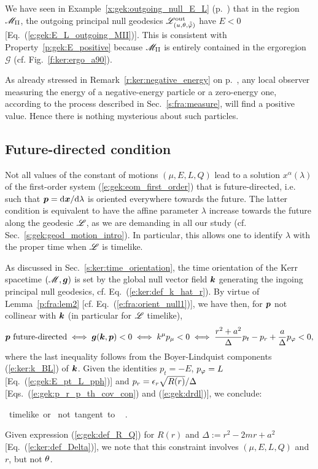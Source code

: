 \begin{example}
We have seen in Example~\ref{x:gek:outgoing_null_E_L} (p.~\pageref{x:gek:outgoing_null_E_L})
that in the region $\mathscr{M}_{\rm II}$, the outgoing principal null geodesics $\mathscr{L}^{\rm out}_{(u,\theta,\tilde{{\tilde\varphi}})}$ have $E<0$ [Eq.~(\ref{e:gek:E_L_outgoing_MII})]. This is consistent with
Property~\ref{p:gek:E_positive} because $\mathscr{M}_{\rm II}$ is entirely contained in the ergoregion $\mathscr{G}$
(cf. Fig.~\ref{f:ker:ergo_a90}).
\end{example}

\begin{remark}
As already stressed in Remark~\ref{r:ker:negative_energy} on p.~\pageref{r:ker:negative_energy}, any local
observer measuring the energy of a negative-energy particle or a zero-energy one, according to the process described in Sec.~\ref{s:fra:measure}, will
find a positive value. Hence there is nothing mysterious about such particles.
\end{remark}

\subsection{Future-directed condition}

Not all values of the constant of motions $(\mu,E,L,Q)$ lead to a solution
$x^\alpha(\lambda)$ of the first-order system (\ref{e:gek:eom_first_order})
that is future-directed, i.e. such that $\bm{p} = \mathrm{d} \bm{x}/\mathrm{d}\lambda$
is oriented everywhere towards the future.
The latter condition is equivalent to have the affine parameter $\lambda$ increase
towards the future along the geodesic $\mathscr{L}$, as we are demanding in all
our study (cf. Sec.~\ref{s:gek:geod_motion_intro}).
In particular, this allows one to identify $\lambda$ with the proper
time when $\mathscr{L}$ is timelike.


As discussed in Sec.~\ref{s:ker:time_orientation}, the time orientation of
the Kerr spacetime $(\mathscr{M},\bm{g})$ is set by the global null
vector field $\bm{k}$ generating the ingoing principal null geodesics, cf. Eq.~(\ref{e:ker:def_k_hat_r}).
By virtue of Lemma~\ref{p:fra:lem2}
[cf. Eq.~(\ref{e:fra:orient_null1})], we have then, for $\bm{p}$ not collinear
with $\bm{k}$ (in particular for $\mathscr{L}$ timelike),
\[
    \bm{p} \ \mbox{future-directed} \iff \bm{g}(\bm{k},\bm{p}) < 0
    \iff k^\mu p_\mu < 0
    \iff \frac{r^2 + a^2}{\Delta} p_t - p_r + \frac{a}{\Delta} p_\varphi < 0 ,
\]
where the last inequality follows from the Boyer-Lindquist components
(\ref{e:ker:k_BL}) of $\bm{k}$.
Given the identities $p_t = -E$, $p_\varphi = L$
[Eq.~(\ref{e:gek:E_pt_L_pph})] and $p_r = \epsilon_r \sqrt{R(r)}/ \Delta $
[Eqs.~(\ref{e:gek:p_r_p_th_cov_con})
and (\ref{e:gek:drdl})], we conclude:
\begin{prop}
\be \label{e:gek:future_directed}
{\Li \ \mbox{timelike or}\atop
{} \ \mbox{not tangent to} \ \Li} \implies
{} .
\ee
\end{prop}
Given expression (\ref{e:gek:def_R_Q}) for $R(r)$ and
$\Delta := r^2 - 2m r + a^2$ [Eq.~(\ref{e:ker:def_Delta})],
we note that this constraint involves $(\mu,E,L,Q)$ and $r$, but not $\theta$.

